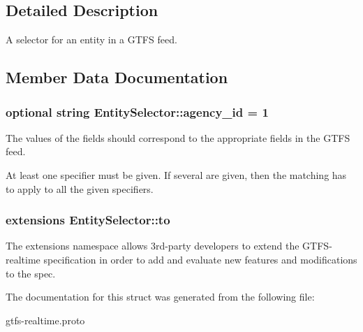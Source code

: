 \subsection{Detailed Description}
A selector for an entity in a G\+T\+FS feed. 

\subsection{Member Data Documentation}
\subsubsection[{\texorpdfstring{agency\+\_\+id}{agency_id}}]{\setlength{\rightskip}{0pt plus 5cm}optional string Entity\+Selector\+::agency\+\_\+id = 1}\hypertarget{structEntitySelector_acbe496a1b62f72e17ef0c274a0c9ad5f}{}\label{structEntitySelector_acbe496a1b62f72e17ef0c274a0c9ad5f}


The values of the fields should correspond to the appropriate fields in the G\+T\+FS feed. 

At least one specifier must be given. If several are given, then the matching has to apply to all the given specifiers. 
\subsubsection[{\texorpdfstring{to}{to}}]{\setlength{\rightskip}{0pt plus 5cm}extensions Entity\+Selector\+::to}\hypertarget{structEntitySelector_a15a176a7bc347ec95f0ffbfa47ee2c47}{}\label{structEntitySelector_a15a176a7bc347ec95f0ffbfa47ee2c47}


The extensions namespace allows 3rd-\/party developers to extend the G\+T\+F\+S-\/realtime specification in order to add and evaluate new features and modifications to the spec. 



The documentation for this struct was generated from the following file\+:\begin{DoxyCompactItemize}
\item 
gtfs-\/realtime.\+proto\end{DoxyCompactItemize}
